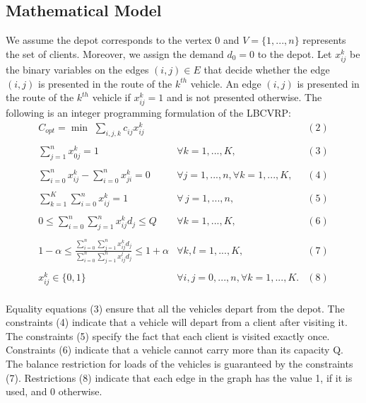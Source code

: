 \subsection {Mathematical Model}
\indent We assume the depot corresponds to the vertex $0$ and $V= \{1,...,n\}$ represents the set of clients. Moreover, we assign the demand $d_{0}=0$ to the depot. Let $x_{ij}^k$ be the binary variables on the edges $(i,j) \in E$ that decide whether the edge $(i,j)$ is presented in the route of the $k^{th}$ vehicle. An edge $(i,j)$ is presented in the route of the $k^{th}$ vehicle if $x_{ij}^k = 1$ and is not presented otherwise. The following is an integer programming formulation of the LBCVRP:\\
$$\begin{array}{*{20}{c}}
{{C_{opt}} = \mathop {\min \,} \,\sum \limits_{i,j,k}{c_{ij}^{}x_{ij}^k} }&{}&{(2)}\\
\\
{\sum\nolimits_{j = 1}^n {x_{0j}^k}  = 1 }&{\forall k = 1,...,K,}&{(3)}\\
\\
{\sum\nolimits_{i = 0}^n {x_{ij}^k}  - \sum\nolimits_{i = 0}^n {x_{ji}^k = 0} }&{\forall j = 1,...,n, \forall k = 1,...,K,}&{(4)}\\
\\
{\sum\nolimits_{k = 1}^K {\sum\nolimits_{i = 0}^n {x_{ij}^k}  = 1} }&{\forall \,j = 1,...,n,}&{(5)}\\
\\
{0 \le \sum\nolimits_{i = 0}^n {\sum\nolimits_{j = 1}^n {x_{ij}^k{d_j}} }  \le Q}&{\forall k=1,...,K,}&{(6)}\\
\\
{1 - \alpha  \le \frac{\sum\nolimits_{i = 0}^n {\sum\nolimits_{j = 1}^n {x_{ij}^k{d_j}} } }{\sum\nolimits_{i = 0}^n {\sum\nolimits_{j = 1}^n {x_{ij}^l{d_j}} }} \le 1 + \alpha }&{\forall k,l=1,...,K,}&{(7)}\\
\\
{x_{ij}^k \in \{ 0,1\} }&{\forall i,j = 0,...,n, \forall k=1,...,K.}&{(8)}
\end{array}$$\\
\indent  Equality equations (3) ensure that all the vehicles depart from the depot. The constraints (4) indicate that a vehicle will depart from a client after visiting it. The constraints (5) specify the fact that each client is visited exactly once. Constraints (6) indicate that a vehicle cannot carry more than its capacity Q. The balance restriction for loads of the vehicles is guaranteed by the constraints (7). Restrictions (8) indicate that each edge in the graph has the value 1, if it is used, and 0 otherwise. \\

